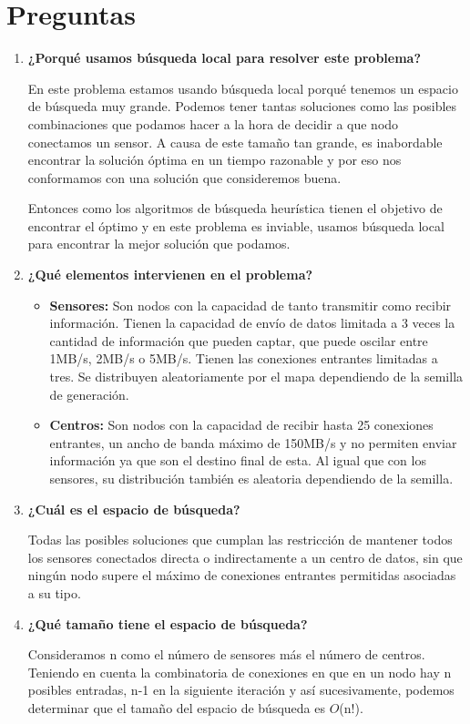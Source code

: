 \documentclass{article}
\begin{document}
\newpage
\section{Preguntas}
\begin{enumerate}
  \item \textbf{¿Porqué usamos búsqueda local para resolver este problema?}\par
    En este problema estamos usando búsqueda local porqué tenemos un espacio de búsqueda muy grande. Podemos tener tantas soluciones como las posibles combinaciones que podamos hacer a la hora de decidir a que nodo conectamos un sensor. A causa de este tamaño tan grande, es inabordable encontrar la solución óptima en un tiempo razonable y por eso nos conformamos con una solución que consideremos buena. \par
    Entonces como los algoritmos de búsqueda heurística tienen el objetivo de encontrar el óptimo y en este problema es inviable, usamos búsqueda local para encontrar la mejor solución que podamos.
  \item \textbf{¿Qué elementos intervienen en el problema?}
  \begin{itemize}
      \item \textbf{Sensores:} Son nodos con la capacidad de tanto transmitir como recibir información. Tienen la capacidad de envío de datos limitada a 3 veces la cantidad de información que pueden captar, que puede oscilar entre 1MB/s, 2MB/s o 5MB/s. Tienen las conexiones entrantes limitadas a tres. Se distribuyen aleatoriamente por el mapa dependiendo de la semilla de generación.
      \item \textbf{Centros:} Son nodos con la capacidad de recibir hasta 25 conexiones entrantes, un ancho de banda máximo de 150MB/s y no permiten enviar información ya que son el destino final de esta. Al igual que con los sensores, su distribución también es aleatoria dependiendo de la semilla.
  \end{itemize}
  \item \textbf{¿Cuál es el espacio de búsqueda?}\par
  Todas las posibles soluciones que cumplan las restricción de mantener todos los sensores conectados directa o indirectamente a un centro de datos, sin que ningún nodo supere el máximo de conexiones entrantes permitidas asociadas a su tipo.
  \item \textbf{¿Qué tamaño tiene el espacio de búsqueda?}\par
  Consideramos n como el número de sensores más el número de centros. Teniendo en cuenta la combinatoria de conexiones en que en un nodo hay n posibles entradas, n-1 en la siguiente iteración y así sucesivamente, podemos determinar que el tamaño del espacio de búsqueda es $O$(n!).

\end{enumerate}
\end{document}
